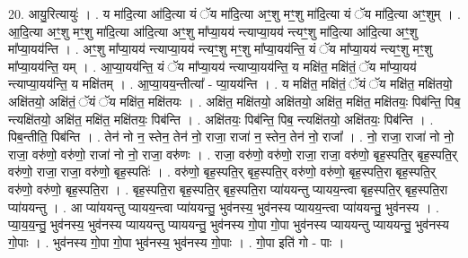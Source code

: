 \documentclass[17pt]{extarticle}
\begin{document}
20. आयु॒रित्यायुः॑ । . य मा॑दि॒त्या आ॑दि॒त्या यं ॅय मा॑दि॒त्या अꣳ॒॒शु मꣳ॒॒शु मा॑दि॒त्या यं ॅय मा॑दि॒त्या अꣳ॒॒शुम् । . आ॒दि॒त्या अꣳ॒॒शु मꣳ॒॒शु मा॑दि॒त्या आ॑दि॒त्या अꣳ॒॒शु मा᳚प्या॒यय॑ न्त्याप्या॒यय॑ न्त्यꣳ॒॒शु मा॑दि॒त्या आ॑दि॒त्या अꣳ॒॒शु मा᳚प्या॒यय॑न्ति । . अꣳ॒॒शु मा᳚प्या॒यय॑ न्त्याप्या॒यय॑ न्त्यꣳ॒॒शु मꣳ॒॒शु मा᳚प्या॒यय॑न्ति॒ यं ॅय मा᳚प्या॒यय॑ न्त्यꣳ॒॒शु मꣳ॒॒शु मा᳚प्या॒यय॑न्ति॒ यम् । . आ॒प्या॒यय॑न्ति॒ यं ॅय मा᳚प्या॒यय॑ न्त्याप्या॒यय॑न्ति॒ य मक्षि॑त॒ मक्षि॑तं॒ ॅय मा᳚प्या॒यय॑ न्त्याप्या॒यय॑न्ति॒ य मक्षि॑तम् । . आ॒प्या॒यय॒न्तीत्या᳚ - प्या॒यय॑न्ति । . य मक्षि॑त॒ मक्षि॑तं॒ ॅयं ॅय मक्षि॑त॒ मक्षि॑तयो॒ अक्षि॑तयो॒ अक्षि॑तं॒ ॅयं ॅय मक्षि॑त॒ मक्षि॑तयः । . अक्षि॑त॒ मक्षि॑तयो॒ अक्षि॑तयो॒ अक्षि॑त॒ मक्षि॑त॒ मक्षि॑तयः॒ पिब॑न्ति॒ पिब॒ न्त्यक्षि॑तयो॒ अक्षि॑त॒ मक्षि॑त॒ मक्षि॑तयः॒ पिब॑न्ति । . अक्षि॑तयः॒ पिब॑न्ति॒ पिब॒ न्त्यक्षि॑तयो॒ अक्षि॑तयः॒ पिब॑न्ति । . पिब॒न्तीति॒ पिब॑न्ति । . तेन॑ नो न॒ स्तेन॒ तेन॑ नो॒ राजा॒ राजा॑ न॒ स्तेन॒ तेन॑ नो॒ राजा᳚ । . नो॒ राजा॒ राजा॑ नो नो॒ राजा॒ वरु॑णो॒ वरु॑णो॒ राजा॑ नो नो॒ राजा॒ वरु॑णः । . राजा॒ वरु॑णो॒ वरु॑णो॒ राजा॒ राजा॒ वरु॑णो॒ बृह॒स्पति॒र् बृह॒स्पति॒र् वरु॑णो॒ राजा॒ राजा॒ वरु॑णो॒ बृह॒स्पतिः॑ । . वरु॑णो॒ बृह॒स्पति॒र् बृह॒स्पति॒र् वरु॑णो॒ वरु॑णो॒ बृह॒स्पति॒रा बृह॒स्पति॒र् वरु॑णो॒ वरु॑णो॒ बृह॒स्पति॒रा । . बृह॒स्पति॒रा बृह॒स्पति॒र् बृह॒स्पति॒रा प्या॑ययन्तु प्यायय॒न्त्वा बृह॒स्पति॒र् बृह॒स्पति॒रा प्या॑ययन्तु । . आ प्या॑ययन्तु प्यायय॒न्त्वा प्या॑ययन्तु॒ भुव॑नस्य॒ भुव॑नस्य प्यायय॒न्त्वा प्या॑ययन्तु॒ भुव॑नस्य । . प्या॒य॒य॒न्तु॒ भुव॑नस्य॒ भुव॑नस्य प्याययन्तु प्याययन्तु॒ भुव॑नस्य गो॒पा गो॒पा भुव॑नस्य प्याययन्तु प्याययन्तु॒ भुव॑नस्य गो॒पाः । . भुव॑नस्य गो॒पा गो॒पा भुव॑नस्य॒ भुव॑नस्य गो॒पाः । . गो॒पा इति॑ गो - पाः । \newline
\end{document}
